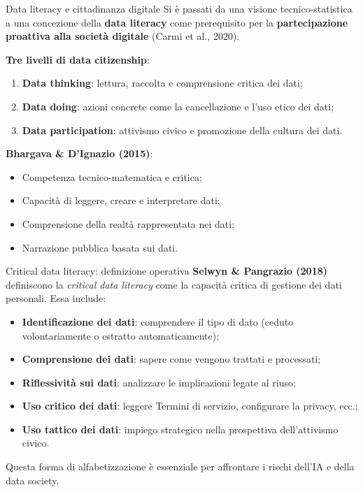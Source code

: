 \documentclass{beamer}
\begin{document}
%
%
\begin{frame}{Data literacy e cittadinanza digitale}
\small
Si è passati da una visione tecnico-statistica a una concezione della \textbf{data literacy} come prerequisito per la \textbf{partecipazione proattiva alla società digitale} (Carmi et al., 2020).

\vspace{0.2cm}
\textbf{Tre livelli di data citizenship}:
\begin{enumerate}
    \item \textbf{Data thinking}: lettura, raccolta e comprensione critica dei dati;
    \item \textbf{Data doing}: azioni concrete come la cancellazione e l’uso etico dei dati;
    \item \textbf{Data participation}: attivismo civico e promozione della cultura dei dati.
\end{enumerate}

\vspace{0.2cm}
\textbf{Bhargava \& D’Ignazio (2015)}:
\begin{itemize}
    \item Competenza tecnico-matematica e critica;
    \item Capacità di leggere, creare e interpretare dati;
    \item Comprensione della realtà rappresentata nei dati;
    \item Narrazione pubblica basata sui dati.
\end{itemize}
\end{frame}
%
%
\begin{frame}{Critical data literacy: definizione operativa}
\small
\textbf{Selwyn \& Pangrazio (2018)} definiscono la \textit{critical data literacy} come la capacità critica di gestione dei dati personali. Essa include:

\vspace{0.2cm}
\begin{itemize}
    \item \textbf{Identificazione dei dati}: comprendere il tipo di dato (ceduto volontariamente o estratto automaticamente);
    \item \textbf{Comprensione dei dati}: sapere come vengono trattati e processati;
    \item \textbf{Riflessività sui dati}: analizzare le implicazioni legate al riuso;
    \item \textbf{Uso critico dei dati}: leggere Termini di servizio, configurare la privacy, ecc.;
    \item \textbf{Uso tattico dei dati}: impiego strategico nella prospettiva dell’attivismo civico.
\end{itemize}

\vspace{0.2cm}
Questa forma di alfabetizzazione è essenziale per affrontare i rischi dell'IA e della data society.
\end{frame}
%
\end{document}
